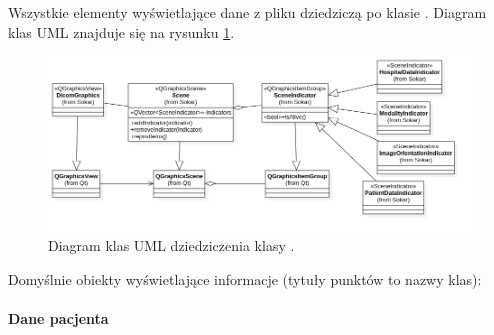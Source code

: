 
\par
Wszystkie elementy wyświetlające dane z pliku \DICOM dziedziczą po klasie .
Diagram klas UML znajduje się na rysunku \ref{uml:sokar-scene-indicators}.

\begin{figure}[!htbp]
    \centering
    \includegraphics[width=\textwidth]{img/uml/dicom-scene-indicators.png}
    \caption{Diagram klas UML dziedziczenia klasy .}
    \label{uml:sokar-scene-indicators}
\end{figure}

\par
Domyślnie obiekty wyświetlające informacje (tytuły punktów to nazwy klas):
\paragraph{Dane pacjenta}

